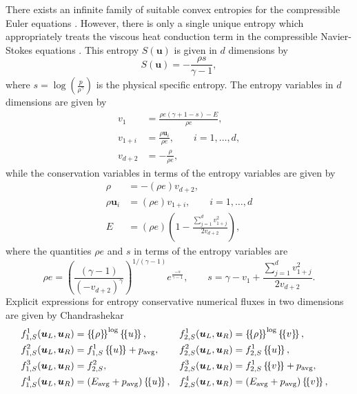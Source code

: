 \documentclass[review,onefignum,onetabnum,final]{siamart171218}
\newcommand{\LRp}[1]{\left( #1 \right)}
\newcommand{\LRc}[1]{\left\{ #1 \right\}}
\newcommand{\avg}[1] {\ensuremath{\LRc{\!\{#1\}\!}}}
\begin{document}
There exists an infinite family of suitable convex entropies for the compressible Euler equations \cite{harten1983symmetric}.  However, there is only a single unique entropy which appropriately treats the viscous heat conduction term in the compressible Navier-Stokes equations \cite{hughes1986new}.  This entropy $S(\bm{u})$ is given in $d$ dimensions by
\begin{equation*}
S(\bm{u}) = -\frac{\rho s}{\gamma-1},
\end{equation*}
where $s = \log\LRp{\frac{p}{\rho^\gamma}}$ is the physical specific entropy.  The entropy variables in $d$ dimensions are given by
\begin{align*}
v_1 &= \frac{\rho e (\gamma + 1 - s) - E}{\rho e}, \\
v_{1+i}&= \frac{\rho \bm{u}_i}{\rho e}, \qquad i = 1,\ldots, d,\\
v_{d+2} &= -\frac{\rho}{\rho e},
\end{align*}
while the conservation variables in terms of the entropy variables are given by
\begin{align*}
\rho &= -(\rho e) v_{d+2}, \\
 \rho \bm{u}_i &= (\rho e) v_{1+i}, \qquad i = 1,\ldots,d\\
 E &= (\rho e)\LRp{1 - \frac{\sum_{j=1}^d{v_{1+j}^2}}{2 v_{d+2}}},
\end{align*}
where the quantities $\rho e$ and $s$ in terms of the entropy variables are 
\begin{equation*}
\rho e = \LRp{\frac{(\gamma-1)}{\LRp{-v_{d+2}}^{\gamma}}}^{1/(\gamma-1)}e^{\frac{-s}{\gamma-1}}, \qquad s = \gamma - v_1 + \frac{\sum_{j=1}^d{v_{1+j}^2}}{2v_{d+2}}.
\end{equation*}
Explicit expressions for entropy conservative numerical fluxes in two dimensions  are given by Chandrashekar \cite{chandrashekar2013kinetic}
\begin{align*}
&f^1_{1,S}(\bm{u}_L,\bm{u}_R) = \avg{\rho}^{\log} \avg{u},& &f^1_{2,S}(\bm{u}_L,\bm{u}_R) = \avg{\rho}^{\log} \avg{v},&\\
&f^2_{1,S}(\bm{u}_L,\bm{u}_R) = f^1_{1,S} \avg{u} + p_{\rm avg},&  &f^2_{2,S}(\bm{u}_L,\bm{u}_R) = f^1_{2,S} \avg{u},&\nonumber\\
&f^3_{1,S}(\bm{u}_L,\bm{u}_R) = f^2_{2,S},& &f^3_{2,S}(\bm{u}_L,\bm{u}_R) = f^1_{2,S} \avg{v} + p_{\rm avg},&\nonumber\\
&f^4_{1,S}(\bm{u}_L,\bm{u}_R) = \LRp{E_{\rm avg} + p_{\rm avg}}\avg{u},& &f^4_{2,S}(\bm{u}_L,\bm{u}_R) = \LRp{E_{\rm avg} + p_{\rm avg} }\avg{v},& \nonumber
\end{align*}
\end{document}
